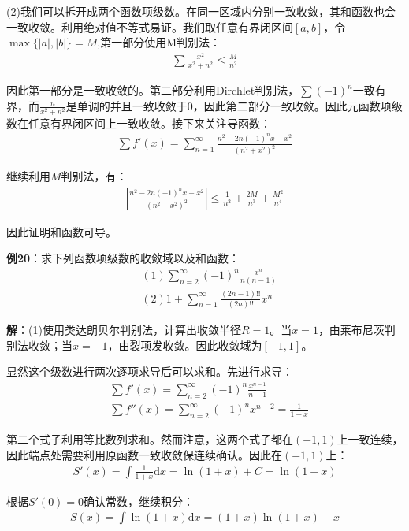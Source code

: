 \documentclass{ctexart}
\let\oldtextbf\textbf
\renewcommand{\textbf}[1]{\textcolor{brown!50!red}{\oldtextbf{#1}}}
\begin{document}
(2)我们可以拆开成两个函数项级数。在同一区域内分别一致收敛，其和函数也会一致收敛。利用绝对值不等式易证。我们取任意有界闭区间$[a,b]$，令$\max\{|a|,|b|\}=M$,第一部分使用M判别法：
\begin{align*}
    \sum\frac{x^2}{x^2+n^2}\leq\frac{M}{n^2}
\end{align*}

因此第一部分是一致收敛的。第二部分利用Dirchlet判别法，$\sum (-1)^n$一致有界，而$\frac{n}{x^2+n^2}$是单调的并且一致收敛于0，因此第二部分一致收敛。因此元函数项级数在任意有界闭区间上一致收敛。接下来关注导函数：
\begin{align*}
    \sum f'(x)=\sum_{n=1}^\infty\frac{n^2-2n(-1)^nx-x^2}{(n^2+x^2)^2}
\end{align*}

继续利用$M$判别法，有：
\begin{align*}
 \left|\frac{n^2-2n(-1)^nx-x^2}{(n^2+x^2)^2}\right|\leq\frac{1}{n^2}+\frac{2M}{n^3}+\frac{M^2}{n^4}   
\end{align*}

因此证明和函数可导。

\textbf{\color{brown!50!red}例20}：求下列函数项级数的收敛域以及和函数：
\begin{align*}
    &(1)\sum_{n=2}^\infty (-1)^n\frac{x^n}{n(n-1)}\\
    &(2)1+\sum_{n=1}^\infty \frac{(2n-1)!!}{(2n)!!}x^n
\end{align*}

\textbf{\color{brown!50!red}解}：(1)使用类达朗贝尔判别法，计算出收敛半径$R=1$。当$x=1$，由莱布尼茨判别法收敛；当$x=-1$，由裂项发收敛。因此收敛域为$[-1,1]$。

显然这个级数进行两次逐项求导后可以求和。先进行求导：
\begin{align*}
    &\sum f'(x)=\sum_{n=2}^\infty (-1)^n\frac{x^{n-1}}{n-1}\\
   & \sum f''(x)=\sum_{n=2}^\infty (-1)^n x^{n-2}=\frac{1}{1+x}
\end{align*}

第二个式子利用等比数列求和。然而注意，这两个式子都在$(-1,1)$上一致连续，因此端点处需要利用原函数一致收敛保连续确认。因此在$(-1,1)$上：
\begin{align*}
    S'(x)=\int\frac{1}{1+x}\mathrm{d}x=\ln(1+x)+C =\ln(1+x)
\end{align*}

根据$S'(0)=0$确认常数，继续积分：
\begin{align*}
    S(x)=\int \ln(1+x)\mathrm{d}x=(1+x)\ln(1+x)-x
\end{align*}
\end{document}
